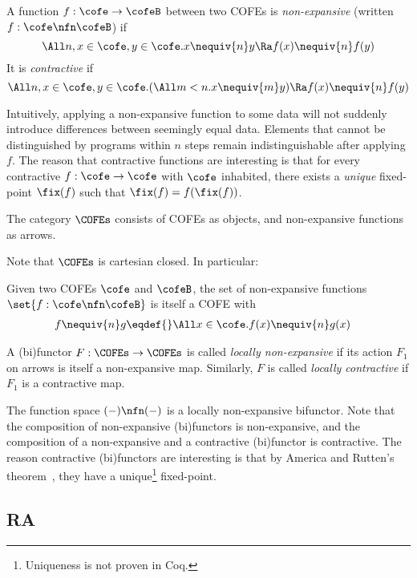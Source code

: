\begin{defn}
  A function $f : \cofe \to \cofeB$ between two COFEs is \emph{non-expansive} (written $f : \cofe \nfn \cofeB$) if
  \[\All n, x \in \cofe, y \in \cofe. x \nequiv{n} y \Ra f(x) \nequiv{n} f(y) \]
  It is \emph{contractive} if
  \[ \All n, x \in \cofe, y \in \cofe. (\All m < n. x \nequiv{m} y) \Ra f(x) \nequiv{n} f(y) \]
\end{defn}
Intuitively, applying a non-expansive function to some data will not suddenly introduce differences between seemingly equal data.
Elements that cannot be distinguished by programs within $n$ steps remain indistinguishable after applying $f$.
The reason that contractive functions are interesting is that for every contractive $f : \cofe \to \cofe$ with $\cofe$ inhabited, there exists a \emph{unique} fixed-point $\fix(f)$ such that $\fix(f) = f(\fix(f))$.

\begin{defn}
  The category $\COFEs$ consists of COFEs as objects, and non-expansive functions as arrows.
\end{defn}

Note that $\COFEs$ is cartesian closed. In particular:
\begin{defn}
  Given two COFEs $\cofe$ and $\cofeB$, the set of non-expansive functions $\set{f : \cofe \nfn \cofeB}$ is itself a COFE with
  \begin{align*}
    f \nequiv{n} g \eqdef{}& \All x \in \cofe. f(x) \nequiv{n} g(x)
  \end{align*}
\end{defn}

\begin{defn}
  A (bi)functor $F : \COFEs \to \COFEs$ is called \emph{locally non-expansive} if its action $F_1$ on arrows is itself a non-expansive map.
  Similarly, $F$ is called \emph{locally contractive} if $F_1$ is a contractive map.
\end{defn}
The function space $(-) \nfn (-)$ is a locally non-expansive bifunctor.
Note that the composition of non-expansive (bi)functors is non-expansive, and the composition of a non-expansive and a contractive (bi)functor is contractive.
The reason contractive (bi)functors are interesting is that by America and Rutten's theorem~\cite{America-Rutten:JCSS89,birkedal:metric-space}, they have a unique\footnote{Uniqueness is not proven in Coq.} fixed-point.

\subsection{RA}

